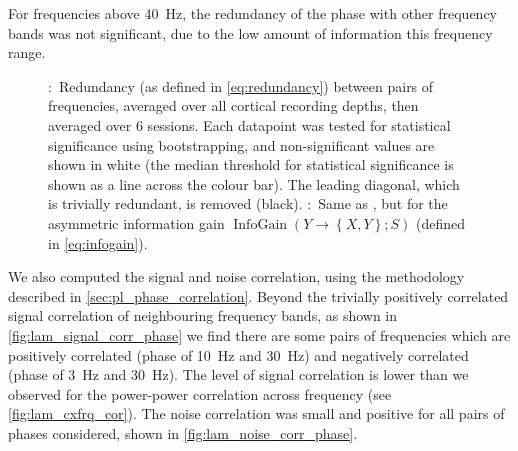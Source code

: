 For frequencies above \SI{40}{Hz}, the redundancy of the phase with other frequency bands was not significant, due to the low amount of information this frequency range.

\begin{figure}[htbp]
\centering
\hspace*{\fill}
\hspace*{\fill}\hspace{.2cm}\hspace*{\fill}
\hspace*{\fill}
    \caption{
\protect{}:~Redundancy (as defined in \autoref{eq:redundancy}) between pairs of frequencies, averaged over all cortical recording depths, then averaged over \num{6} sessions.
Each datapoint was tested for statistical significance using bootstrapping, and non-significant values are shown in white (the median threshold for statistical significance is shown as a line across the colour bar).
The leading diagonal, which is trivially redundant, is removed (black).
\protect{}:~Same as \protect{}, but for the asymmetric information gain $\operatorname{InfoGain}\left(Y\to\left\{X,Y\right\};S\right)$ (defined in \autoref{eq:infogain}).
}
\label{fig:lam_phase_cxfrq_info}
\end{figure}


We also computed the signal and noise correlation, using the methodology described in \autoref{sec:pl_phase_correlation}.
Beyond the trivially positively correlated signal correlation of neighbouring frequency bands, as shown in \autoref{fig:lam_signal_corr_phase} we find there are some pairs of frequencies which are positively correlated (phase of \SI{10}{Hz} and \SI{30}{Hz}) and negatively correlated (phase of \SI{3}{Hz} and \SI{30}{Hz}).
The level of signal correlation is lower than we observed for the power-power correlation across frequency (see \autoref{fig:lam_cxfrq_cor}).
The noise correlation was small and positive for all pairs of phases considered, shown in \autoref{fig:lam_noise_corr_phase}.


